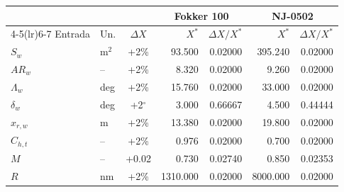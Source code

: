 \begin{tabular}{llcrrrr}
\toprule
 & & & \multicolumn{2}{c}{Fokker 100} & \multicolumn{2}{c}{NJ-0502} \\
\cmidrule(lr){4-5}\cmidrule(lr){6-7}
Entrada & Un. & $\Delta X$ & $X^*$ & $\Delta X/X^*$ & $X^*$ & $\Delta X/X^*$ \\
\midrule
$S_w$ & m$^2$ & +2\% & 93.500 & 0.02000 & 395.240 & 0.02000 \\
$AR_w$ & -- & +2\% & 8.320 & 0.02000 & 9.260 & 0.02000 \\
$\Lambda_w$ & deg & +2\% & 15.760 & 0.02000 & 33.000 & 0.02000 \\
$\delta_w$ & deg & +2$^{\circ}$ & 3.000 & 0.66667 & 4.500 & 0.44444 \\
$x_{r,w}$ & m & +2\% & 13.380 & 0.02000 & 19.800 & 0.02000 \\
$C_{h,t}$ & -- & +2\% & 0.976 & 0.02000 & 0.700 & 0.02000 \\
$M$ & -- & +0.02 & 0.730 & 0.02740 & 0.850 & 0.02353 \\
$R$ & nm & +2\% & 1310.000 & 0.02000 & 8000.000 & 0.02000 \\
\bottomrule
\end{tabular}